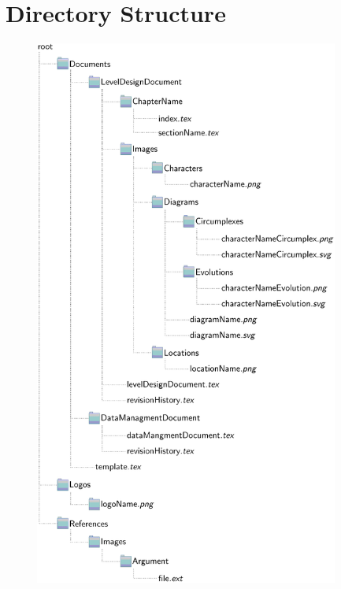 \documentclass[12pt]{article}
\begin{document}
\section{Directory Structure}
\begin{center}
  \begin{figure}[H]
  \centering
  \includegraphics[width=10cm]{DataMangmentDocument/directories}
  \end{figure}
\end{center}
\end{document}
